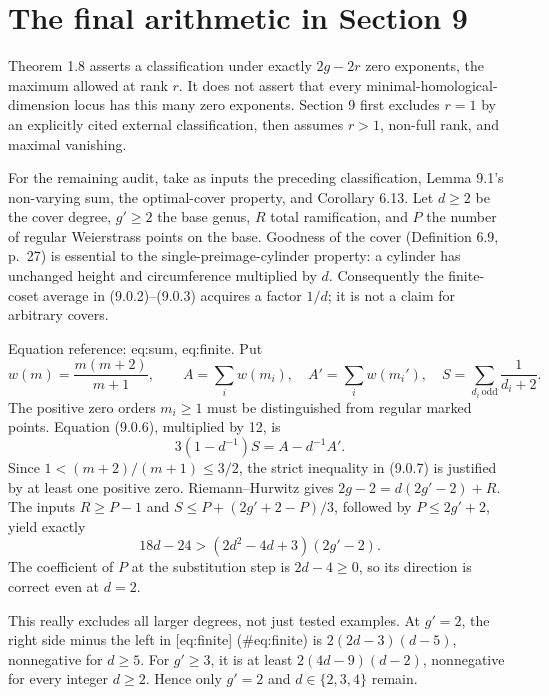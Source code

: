 \documentclass[10pt]{article}
\begin{document}
\section*{The final arithmetic in Section 9}
Theorem 1.8 asserts a classification under exactly \(2g-2r\) zero exponents, the maximum allowed at rank \(r\). It does not assert that every minimal-homological-dimension locus has this many zero exponents. Section 9 first excludes \(r=1\) by an explicitly cited external classification, then assumes \(r>1\), non-full rank, and maximal vanishing.\par
For the remaining audit, take as inputs the preceding classification, Lemma 9.1’s non-varying sum, the optimal-cover property, and Corollary 6.13. Let \(d\geq2\) be the cover degree, \(g'\geq2\) the base genus, \(R\) total ramification, and \(P\) the number of regular Weierstrass points on the base. Goodness of the cover (Definition 6.9, p. 27) is essential to the single-preimage-cylinder property: a cylinder has unchanged height and circumference multiplied by \(d\). Consequently the finite-coset average in (9.0.2)–(9.0.3) acquires a factor \(1/d\); it is not a claim for arbitrary covers.\par
Equation reference: eq:sum, eq:finite. Put \[w(m)=\frac{m(m+2)}{m+1},\qquad
 A=\sum_iw(m_i),\quad A'=\sum_iw(m_i'),\quad
 S=\sum_{d_i\ \mathrm{odd}}\frac{1}{d_i+2}.\] The positive zero orders \(m_i\geq1\) must be distinguished from regular marked points. Equation (9.0.6), multiplied by 12, is \[
 3(1-d^{-1})S=A-d^{-1}A'.\] Since \(1<(m+2)/(m+1)\leq3/2\), the strict inequality in (9.0.7) is justified by at least one positive zero. Riemann–Hurwitz gives \(2g-2=d(2g'-2)+R\). The inputs \(R\geq P-1\) and \(S\leq P+(2g'+2-P)/3\), followed by \(P\leq2g'+2\), yield exactly \[
 18d-24>(2d^2-4d+3)(2g'-2).\] The coefficient of \(P\) at the substitution step is \(2d-4\geq0\), so its direction is correct even at \(d=2\).\par
This really excludes all larger degrees, not just tested examples. At \(g'=2\), the right side minus the left in [eq:finite] (\#eq:finite) is \(2(2d-3)(d-5)\), nonnegative for \(d\geq5\). For \(g'\geq3\), it is at least \(2(4d-9)(d-2)\), nonnegative for every integer \(d\geq2\). Hence only \(g'=2\) and \(d\in\{2,3,4\}\) remain.\par
\end{document}

